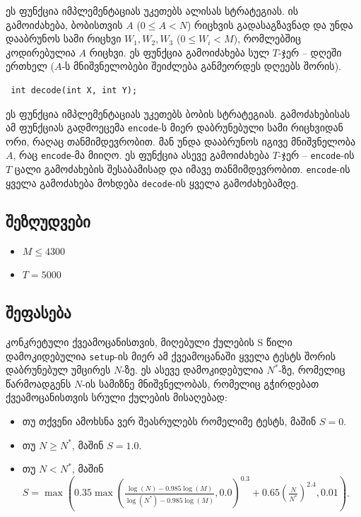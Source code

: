 \documentclass[12pt]{article}
\begin{document}
ეს ფუნქცია იმპლემენტაციას უკეთებს ალისას სტრატეგიას. ის გამოიძახება, ბობისთვის $A$ ($0 \leq A < N$) რიცხვის გადასაგზავნად და უნდა დააბრუნოს სამი რიცხვი $W_1, W_2, W_3$ ($0 \leq W_i < M$), რომლებშიც კოდირებულია $A$ რიცხვი. ეს ფუნქცია გამოიძახება სულ $T$-ჯერ -- დღეში ერთხელ ($A$-ს მნიშვნელობები შეიძლება განმეორდეს დღეებს შორის).

\begin{lstlisting}
 int decode(int X, int Y);
\end{lstlisting}

ეს ფუნქცია იმპლემენტაციას უკეთებს ბობის სტრატეგიას. გამოძახებისას ამ ფუნქციას გადმოეცემა \texttt{encode}-ს მიერ დაბრუნებული სამი რიცხვიდან ორი, რაღაც თანმიმდევრობით. მან უნდა დააბრუნოს იგივე მნიშვნელობა $A$, რაც \texttt{encode}-მა მიიღო. ეს ფუნქცია ასევე გამოიძახება $T$-ჯერ --  \texttt{encode}-ის $T$ ცალი გამოძახების შესაბამისად და იმავე თანმიმდევრობით. \texttt{encode}-ის ყველა გამოძახება მოხდება \texttt{decode}-ის ყველა გამოძახებამდე.

\subsection{შეზღუდვები}

\begin{itemize}
\item $M \leq 4300$
\item $T = 5000$
\end{itemize}

\subsection{შეფასება}

კონკრეტული ქვეამოცანისთვის, მიღებული ქულების S წილი დამოკიდებულია \texttt{setup}-ის მიერ ამ ქვეამოცანაში ყველა ტესტს შორის დაბრუნებულ უმცირეს $N$-ზე. ეს ასევე დამოკიდებულია $N^*$-ზე, რომელიც წარმოადგენს $N$-ის სამიზნე მნიშვნელობას, რომელიც გჭირდებათ ქვეამოცანისთვის სრული ქულების მისაღებად:

\begin{itemize}
\item თუ თქვენი ამოხსნა ვერ შეასრულებს რომელიმე ტესტს, მაშინ $S = 0$.
\item თუ $N \geq N^*$, მაშინ $S = 1.0$.
\item თუ $N < N^*$, მაშინ $S = \max\left(0.35 \max\left(\frac{\log(N) - 0.985 \log(M)}{\log(N^*) - 0.985 \log(M)}, 0.0\right)^{0.3} + 0.65 \left(\frac{N}{N^*}\right)^{2.4}, 0.01\right)$.
\end{itemize}
\end{document}
